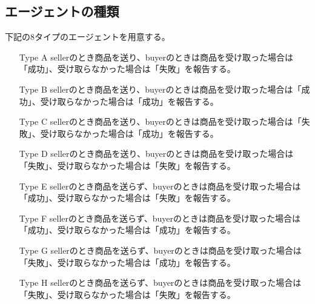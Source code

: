 \subsection{エージェントの種類}
下記の8タイプのエージェントを用意する。
\begin{itemize}
  \item [Type A] sellerのとき商品を送り、buyerのときは商品を受け取った場合は「成功」、受け取らなかった場合は「失敗」を報告する。
  \item [Type B] sellerのとき商品を送り、buyerのときは商品を受け取った場合は「成功」、受け取らなかった場合は「成功」を報告する。
  \item [Type C] sellerのとき商品を送り、buyerのときは商品を受け取った場合は「失敗」、受け取らなかった場合は「成功」を報告する。
  \item [Type D] sellerのとき商品を送り、buyerのときは商品を受け取った場合は「失敗」、受け取らなかった場合は「失敗」を報告する。
  \item [Type E] sellerのとき商品を送らず、buyerのときは商品を受け取った場合は「成功」、受け取らなかった場合は「失敗」を報告する。
  \item [Type F] sellerのとき商品を送らず、buyerのときは商品を受け取った場合は「成功」、受け取らなかった場合は「成功」を報告する。
  \item [Type G] sellerのとき商品を送らず、buyerのときは商品を受け取った場合は「失敗」、受け取らなかった場合は「成功」を報告する。
  \item [Type H] sellerのとき商品を送らず、buyerのときは商品を受け取った場合は「失敗」、受け取らなかった場合は「失敗」を報告する。
\end{itemize}

